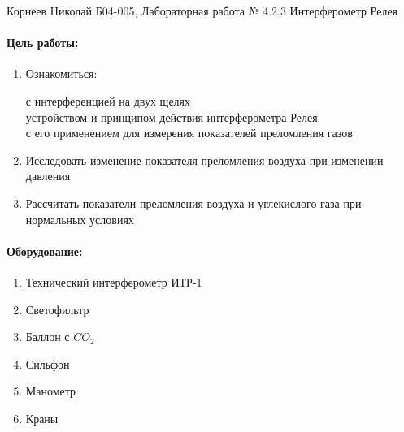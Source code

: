 \documentclass[a4paper,12pt]{article}
\author{Бичина Марина 
группа Б04-005 1 курса ФЭФМ}
\title{}
\date{}
\begin{document}

\begin{center}
\begin{Large}
{Корнеев Николай Б04-005, Лабораторная работа № 4.2.3 Интерферометр Релея}
\end{Large}
\end{center}
\paragraph{Цель работы:} 
\begin{enumerate}
\itemsep0em
\item Ознакомиться:

 с интерференцией на двух щелях\\
 устройством и принципом действия интерферометра Релея\\
 с его применением для измерения показателей преломления газов
 \item Исследовать изменение показателя преломления воздуха при изменении давления 
 \item Рассчитать показатели преломления воздуха и углекислого газа при нормальных условиях
\end{enumerate}
\paragraph{Оборудование:}
\begin{enumerate}
\itemsep0em
\item Технический интерферометр ИТР-1
\item Светофильтр
\item Баллон с $CO_2$ 
\item Сильфон
\item Манометр
\item Краны
\end{enumerate}
\end{document}
